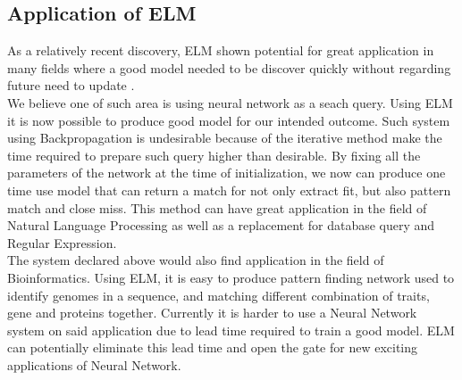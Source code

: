 \documentclass[13pt]{article}
\begin{document}
\subsection{Application of ELM}
As a relatively recent discovery, ELM shown potential for great application in many fields where a good model needed to be discover quickly without regarding future need to update \cite{huang_extreme_2016}.\\
We believe one of such area is using neural network as a seach query. Using ELM it is now possible to produce good model for our intended outcome. Such system using Backpropagation is undesirable because of the iterative method make the time required to prepare such query higher than desirable. By fixing all the parameters of the network at the time of initialization, we now can produce one time use model that can return a match for not only extract fit, but also pattern match and close miss. This method can have great application in the field of Natural Language Processing as well as a replacement for database query and Regular Expression.\\
The system declared above would also find application in the field of Bioinformatics. Using ELM, it is easy to produce pattern finding network used to identify genomes in a sequence, and matching different combination of traits, gene and proteins together. Currently it is harder to use a Neural Network system on said application due to lead time required to train a good model. ELM can potentially eliminate this lead time and open the gate for new exciting applications of Neural Network. 


\newpage
\appendix 
\end{document}
